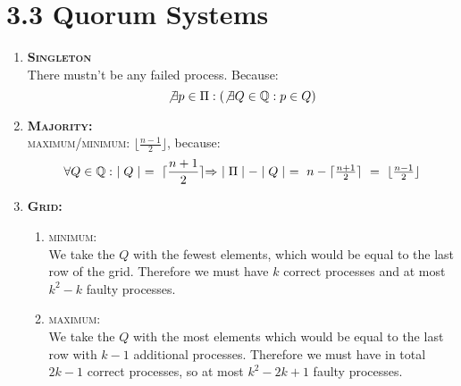 \documentclass{article}
\begin{document}
	\section*{3.3 Quorum Systems}
	\begin{adjustwidth}{2em}{2em}
		\begin{enumerate}[\footnotesize{\textbullet}]
			\item \textsc{\textbf{Singleton}} \\
			There mustn't be any failed process. Because:
			\[
				\not\exists p \in \Pi : (\not\exists Q \in \mathbb{Q}: p \in Q)
			\]
			\item \textsc{\textbf{Majority:}} \\
			\textsc{maximum/minimum:} $\lfloor \frac{n-1}{2} \rfloor$, because:
			\[
				\forall Q \in \mathbb{Q}: \ \mid Q \mid \ = \ \lceil \frac{n+1}{2} \rceil $$ $$
				\Rightarrow \ \mid \Pi \mid - \mid Q \mid \ = \ n - \lceil \frac{n+1}{2} \rceil \ = \ \lfloor \frac{n-1}{2} \rfloor
			\]
			\item \textsc{\textbf{Grid:}}
			\begin{enumerate}[]
				\item \textsc{minimum:} \\
				We take the $Q$ with the fewest elements, which would be equal to the last row of the grid. Therefore we must have $k$ correct processes and at most $k^{2} - k$ faulty processes.
				\item \textsc{maximum:} \\
				We take the $Q$ with the most elements which would be equal to the last row with $k-1$ additional processes. Therefore we must have in total $2k-1$ correct processes, so at most $k^{2} - 2k +1$ faulty processes.
			\end{enumerate}
		\end{enumerate}
	\end{adjustwidth}
	
	\newpage
	
\end{document}

